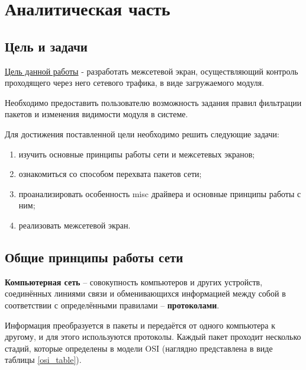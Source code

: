 \section{Аналитическая часть}

\subsection{Цель и задачи}
\underline{Цель данной работы} - разработать межсетевой экран, осуществляющий контроль проходящего через него сетевого трафика, в виде загружаемого модуля.

Необходимо предоставить пользователю возможность задания правил фильтрации пакетов и изменения видимости модуля в системе.

Для достижения поставленной цели необходимо решить следующие задачи:
\begin{enumerate}
	\item изучить основные принципы работы сети и межсетевых экранов;
	
	\item ознакомиться со способом перехвата пакетов сети;
	
	\item проанализировать особенность misc драйвера и основные принципы работы с ним;
	
	\item реализовать межсетевой экран. \newline
\end{enumerate}

\subsection{Общие принципы работы сети}
\textbf{Компьютерная сеть} -- совокупность компьютеров и других устройств, соединённых линиями связи и обменивающихся информацией между собой в соответствии с определёнными правилами -- \textbf{протоколами}. \cite{net}

Информация преобразуется в пакеты и передаётся от одного компьютера к другому, и для этого используются протоколы. Каждый пакет проходит несколько стадий, которые определены в модели OSI (наглядно представлена в виде таблицы \ref{osi_table}).

